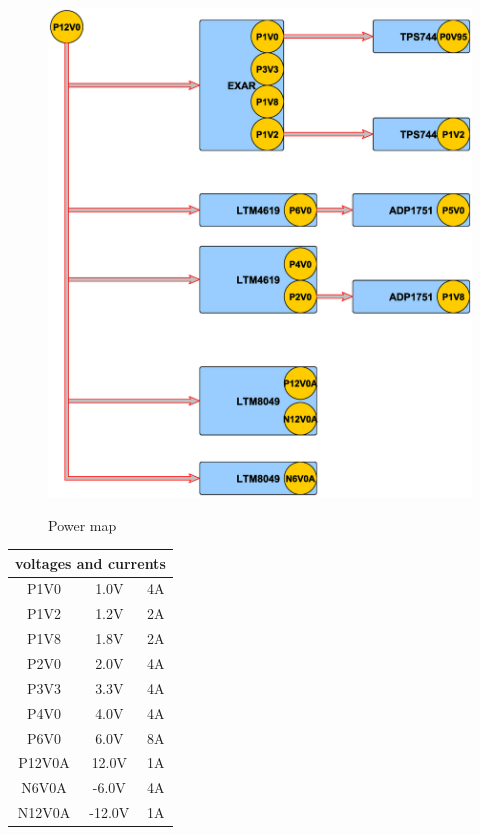 	\begin{figure}[htbp!]
		\centering
		\includegraphics[scale=0.3]{img/pwr.eps}\\
		\caption{Power map} \label{powermap}
	\end{figure}
	

\begin{longtable}{|c|c|c|} \hline
\multicolumn{3}{|c|}{voltages and currents}	\\ \hline
P1V0 & 1.0V & 4A \\ \hline
P1V2 & 1.2V & 2A\\ \hline
P1V8 & 1.8V & 2A\\ \hline
P2V0 & 2.0V & 4A\\ \hline
P3V3 & 3.3V & 4A\\ \hline
P4V0 & 4.0V & 4A\\ \hline
P6V0 & 6.0V & 8A\\ \hline
P12V0A & 12.0V & 1A \\ \hline
N6V0A & -6.0V & 4A\\ \hline
N12V0A & -12.0V & 1A \\ \hline

\end{longtable}
	
